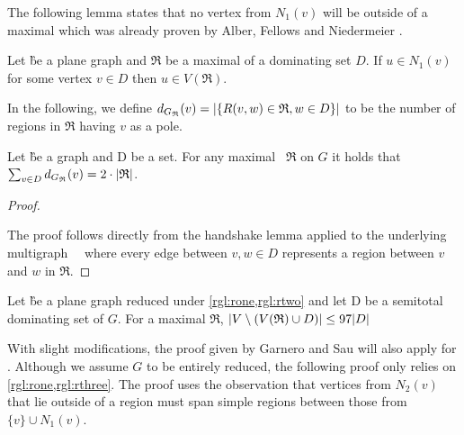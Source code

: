 

\noindent The following lemma states that no vertex from $N_1(v)$ will be outside of a maximal \dreg which was already proven by Alber, Fellows and Niedermeier \cite[Lemma 6]{Alber2004}.

\begin{lemma}\label{lemma:noneinside}
    Let \G be a plane graph and $\mathfrak{R}$ be a maximal \dreg of a dominating set $D$. If $u \in N_1(v)$ for some vertex $v \in D$ then $u \in V(\mathfrak{R})$.
\end{lemma}

In the following, we define $d_{G_{\mathfrak{R}}}(v) = \abs{\{R(v,w) \in \mathfrak{R}, w \in D\}}$ to be the number of regions in $\mathfrak{R}$ having $v$ as a pole. 

\begin{corollary}
    Let \G be a graph and D be a set. For any maximal \dreg~$\mathfrak{R}$ on $G$ it holds that $\sum_{v \in D} d_{G_{\mathfrak{R}}}(v) = 2 \cdot \abs{\mathfrak{R}}$.
\end{corollary}
\begin{proof}\label{lemma:polesBound}
    
    The proof follows directly from the handshake lemma applied to the underlying multigraph~\GR~ where every edge between $v,w \in D$ represents a region between $v$ and $w$ in $\mathfrak{R}$.
\end{proof}

\begin{proposition}\label{lemma:outside}
    Let \G be a plane graph reduced under \cref*{rgl:rone,rgl:rtwo} and let D be a semitotal dominating set of $G$. For a maximal \dreg $\mathfrak{R}$,  $\abs{V \setminus (V(\mathfrak{R}) \cup D)} \leq 97 \abs{D}$
\end{proposition}

With slight modifications, the proof given by Garnero and Sau \cite[arXiv v2]{Garnero2018} will also apply for \sdom. Although we assume $G$ to be entirely reduced, the following proof only relies on \cref{rgl:rone,rgl:rthree}. The proof uses the observation that vertices from $N_2(v)$ that lie outside of a region must span simple regions between those from $\{v\} \cup N_1(v)$.


